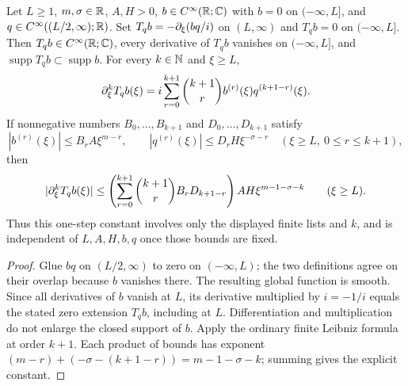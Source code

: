\begin{lemma}
  \label{lem:c04_osc_ibp_step}
  Let $L\ge1$, $m,\sigma\in\mathbb{R}$, $A,H>0$,
  $b\in C^\infty(\mathbb{R};\mathbb{C})$ with $b=0$ on $(-\infty,L]$, and
  $q\in C^\infty((L/2,\infty);\mathbb{R})$.
  Set $T_qb=-\partial_\xi(bq/i)$ on $(L,\infty)$ and $T_qb=0$ on $(-\infty,L]$.
  Then $T_qb\in C^\infty(\mathbb{R};\mathbb{C})$, every derivative of $T_qb$ vanishes on
  $(-\infty,L]$, and $\operatorname{supp}T_qb\subset\operatorname{supp}b$.
  For every $k\in\mathbb{N}$ and $\xi\ge L$,
  \[
    \partial_\xi^kT_qb(\xi)
      =i\sum_{r=0}^{k+1}\binom{k+1}{r}b^{(r)}(\xi)q^{(k+1-r)}(\xi).
  \]
  If nonnegative numbers $B_0,\ldots,B_{k+1}$ and $D_0,\ldots,D_{k+1}$ satisfy
  \[
    |b^{(r)}(\xi)|\le B_rA\xi^{m-r},\qquad
    |q^{(r)}(\xi)|\le D_rH\xi^{-\sigma-r}
       \quad(\xi\ge L,\ 0\le r\le k+1),
  \]
  then
  \[
    |\partial_\xi^kT_qb(\xi)|\le
      \left(\sum_{r=0}^{k+1}\binom{k+1}{r}B_rD_{k+1-r}\right)
      AH\xi^{m-1-\sigma-k}\qquad(\xi\ge L).
  \]
  Thus this one-step constant involves only the displayed finite lists and $k$,
  and is independent of $L,A,H,b,q$ once those bounds are fixed.
\end{lemma}
\begin{proof}
  Glue $bq$ on $(L/2,\infty)$ to zero on $(-\infty,L)$; the two definitions agree
  on their overlap because $b$ vanishes there. The resulting global function is smooth.
  Since all derivatives of $b$ vanish at $L$, its derivative multiplied by $i=-1/i$
  equals the stated zero extension $T_qb$, including at $L$.
  Differentiation and multiplication do not enlarge the closed support of $b$.
  Apply the ordinary finite Leibniz formula at order $k+1$.
  Each product of bounds has exponent
  $(m-r)+(-\sigma-(k+1-r))=m-1-\sigma-k$; summing gives the explicit constant.
\end{proof}

